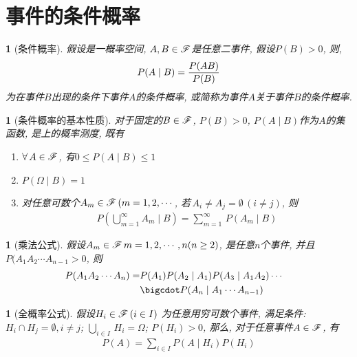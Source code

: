 \section{事件的条件概率}

\newtheorem{conditional_probability}[theorem_root]{}
\begin{conditional_probability}[条件概率]
假设\prbsp 是一概率空间, \(A, B\in\msF\)是任意二事件, 假设\(P(B) > 0\), 则,
\begin{align}
    P(A\mid B) = {P(AB)\over P(B)}
\end{align}
为在事件\(B\)出现的条件下事件\(A\)的条件概率, 或简称为事件\(A\)关于事件\(B\)的条件概率.
\end{conditional_probability}

\newtheorem{basic_properties_of__}[theorem_root]{\remark}
\begin{basic_properties_of__}[条件概率的基本性质]
对于固定的\(B\in\msF\), \(P(B)>0\), \(P(A\mid B)\)作为\(A\)的集函数, 是\msF 上的概率测度, 既有
\begin{enumerate}
    \item \(\forall\,A\in\msF\), 有\(0\le P(A\mid B) \le 1\)
    \item \(P(\Omega\mid B) = 1\)
    \item 对任意可数个\(A_m\in\msF\,(m= 1, 2, \cdots\), 若\(\,A_i\ne A_j = \emptyset\, (i\ne j)\), 则
    \begin{align}
        P\left(\bigcup\limits_{m=1}^\infty A_m \mid  B\right) = \sum\limits_{m=1}^\infty\,P(A_m\mid B)
    \end{align}
\end{enumerate}
\end{basic_properties_of__}

\newtheorem{addition_formula}[theorem_root]{\theorem}
\begin{addition_formula}[乘法公式]
假设\(A_m\in\msF\,m = 1, 2, \cdots, n(n\ge 2)\), 是任意\(n\)个事件, 并且\(P(A_1A_2\cdots A_{n-1}>0\), 则
\begin{align}
    P(A_1A_2\cdots A_n) = &P(A_1)P(A_2\mid A_1)P(A_3\mid A_1A_2)\cdots\cr
                          &\bigcdot P(A_n\mid A_1\cdots A_{n-1})
\end{align}
\end{addition_formula}

\newtheorem{full_probability_formula}[theorem_root]{\theorem}
\begin{full_probability_formula}[全概率公式]
    假设\(H_i\in\msF\,(i\in I)\) 为任意用穷可数个事件, 满足条件:
    \(H_i\cap H_j = \emptyset, i\ne j\); \(\bigcup\limits_{i\in I}\,H_i = \Omega\); 
    \(P(H_i) > 0\), 那么, 对于任意事件\(A\in\msF\), 有
    \begin{align}
        P(A) = \sum\limits_{i\in I}P(A\mid H_i) P(H_i)
    \end{align}
\end{full_probability_formula}

